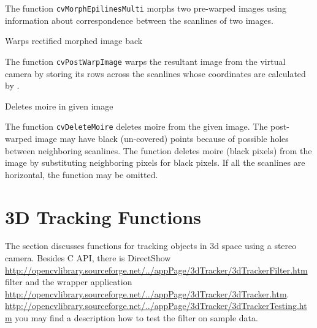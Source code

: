 The function \texttt{cvMorphEpilinesMulti} morphs two pre-warped images using information about correspondence between the scanlines of two images.


Warps rectified morphed image back


\begin{description}
\end{description}

The function \texttt{cvPostWarpImage} warps the resultant image from the virtual camera by storing its rows across the scanlines whose coordinates are calculated by .


Deletes moire in given image


\begin{description}
\end{description}

The function \texttt{cvDeleteMoire} deletes moire from the given image. The post-warped image may have black (un-covered) points because of possible holes between neighboring scanlines. The function deletes moire (black pixels) from the image by substituting neighboring pixels for black pixels. If all the scanlines are horizontal, the function may be omitted.

\section{3D Tracking Functions} %

The section discusses functions for tracking objects in 3d space using a stereo camera. Besides C API, there is DirectShow
\url{http://opencvlibrary.sourceforge.net/../appPage/3dTracker/3dTrackerFilter.htm}
filter and the wrapper application
\url{http://opencvlibrary.sourceforge.net/../appPage/3dTracker/3dTracker.htm}.
\url{http://opencvlibrary.sourceforge.net/../appPage/3dTracker/3dTrackerTesting.htm} you may find a description how to test the filter on sample data.

